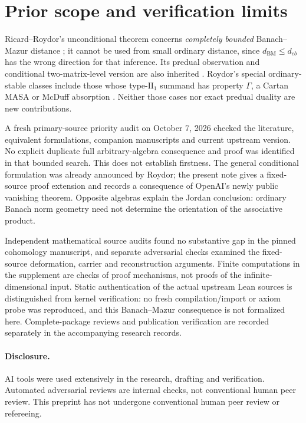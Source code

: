 \documentclass[11pt]{article}
\newcommand{\BM}{d_{\mathrm{BM}}}
\begin{document}
\section{Prior scope and verification limits}
Ricard--Roydor's unconditional theorem concerns \emph{completely bounded}
Banach--Mazur distance \cite[Theorem A]{RicardRoydor}; it cannot be used
from small ordinary distance, since $\BM\le d_{cb}$ has the wrong
direction for that inference. Its predual observation and conditional
two-matrix-level version are also inherited \cite[Remarks 3.4 and
3.7]{RicardRoydor}. Roydor's special ordinary-stable classes include
those whose type-$\mathrm{II}_1$ summand has property $\Gamma$, a
Cartan MASA or McDuff absorption \cite[Corollary 1.3]{Roydor2022}.
Neither those cases nor exact predual duality are new contributions.

A fresh primary-source priority audit on October 7, 2026 checked the
literature, equivalent formulations, companion manuscripts and current
upstream version. No explicit duplicate full arbitrary-algebra consequence
and proof was identified in that bounded search. This does not establish
firstness. The general conditional formulation was already announced
by Roydor; the present note gives a fixed-source proof extension and
records a consequence of OpenAI's newly public vanishing theorem.
Opposite algebras explain the Jordan conclusion: ordinary Banach norm
geometry need not determine the orientation of the associative product.

Independent mathematical source audits found no substantive gap in the
pinned cohomology manuscript, and separate adversarial checks examined
the fixed-source deformation, carrier and reconstruction arguments.
Finite computations in the supplement are checks of proof mechanisms,
not proofs of the infinite-dimensional input. Static authentication of
the actual upstream Lean sources is distinguished from kernel verification:
no fresh compilation/import or axiom probe was reproduced, and this
Banach--Mazur consequence is not formalized here. Complete-package
reviews and publication verification are recorded separately in the
accompanying research records.

\paragraph{Disclosure.}
AI tools were used extensively in the research, drafting and verification.
Automated adversarial reviews are internal checks, not conventional human
peer review. This preprint has not undergone conventional human peer
review or refereeing.
\end{document}
